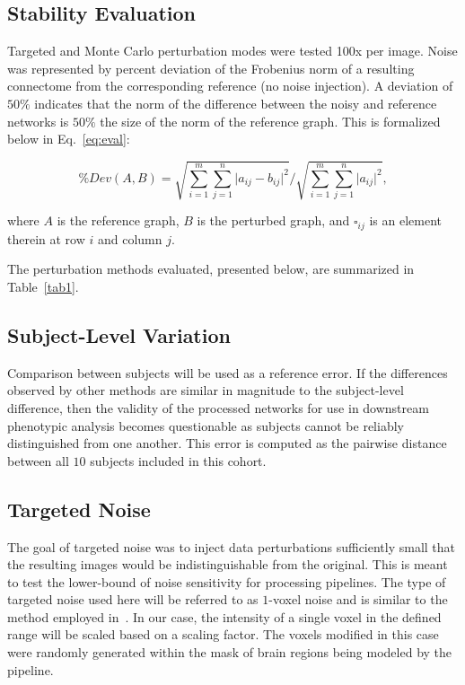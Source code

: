 \documentclass[fleqn,12pt]{SelfArx_ch} %
\begin{document}
\subsection{Stability Evaluation}
Targeted and Monte Carlo perturbation modes were tested 100x per image. Noise was represented by percent deviation of
the Frobenius norm of a resulting connectome from the corresponding reference (no noise injection). A deviation of
$50 \%$ indicates that the norm of the difference between the noisy and reference networks is $50 \%$ the size of the
norm of the reference graph. This is formalized below in Eq.~\eqref{eq:eval}:

\begin{equation}
\% Dev (A, B) = \sqrt{\sum_{i=1}^m\sum_{j=1}^n \lvert a_{ij} - b_{ij} \rvert^2 } / \sqrt{\sum_{i=1}^m\sum_{j=1}^n \lvert a_{ij} \rvert^2},
\label{eq:eval}
\end{equation}

where $A$ is the reference graph, $B$ is the perturbed graph, and $\square_{ij}$ is an element therein at row $i$ and
column $j$.

The perturbation methods evaluated, presented below, are summarized in Table~\ref{tab1}.

\subsection{Subject-Level Variation}
Comparison between subjects will be used as a reference error. If the differences observed by other methods are similar
in magnitude to the subject-level difference, then the validity of the processed networks for use in downstream
phenotypic analysis becomes questionable as subjects cannot be reliably distinguished from one another. This error is
computed as the pairwise distance between all $10$ subjects included in this cohort.

\subsection{Targeted Noise}
The goal of targeted noise was to inject data perturbations sufficiently small that the resulting images would be
indistinguishable from the original. This is meant to test the lower-bound of noise sensitivity for processing
pipelines. The type of targeted noise used here will be referred to as $1$-voxel noise and is similar to the method
employed in~\cite{Lewis2017-ll}. In our case, the intensity of a single voxel in the defined range will be scaled based
on a scaling factor. The voxels modified in this case were randomly generated within the mask of brain regions being
modeled by the pipeline.
\end{document}
